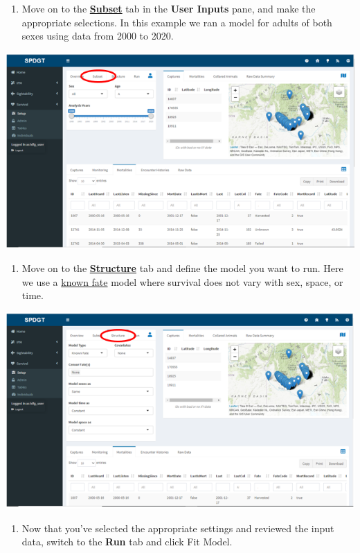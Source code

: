 \documentclass[
]{book}
\providecommand{\tightlist}{%
  \setlength{\itemsep}{0pt}\setlength{\parskip}{0pt}}
\begin{document}
\begin{enumerate}
\def\labelenumi{\arabic{enumi}.}
\setcounter{enumi}{5}
\tightlist
\item
  Move on to the \protect\hyperlink{surv-options}{\textbf{Subset}} tab in the \textbf{User Inputs} pane, and make the appropriate selections. In this example we ran a model for adults of both sexes using data from 2000 to 2020.
\end{enumerate}

\includegraphics{./www/surv_06.PNG}

\begin{enumerate}
\def\labelenumi{\arabic{enumi}.}
\setcounter{enumi}{6}
\tightlist
\item
  Move on to the \protect\hyperlink{surv-options}{\textbf{Structure}} tab and define the model you want to run. Here we use a \protect\hyperlink{gl-known-fate}{known fate} model where survival does not vary with sex, space, or time.
\end{enumerate}

\includegraphics{./www/surv_07.PNG}

\begin{enumerate}
\def\labelenumi{\arabic{enumi}.}
\setcounter{enumi}{7}
\tightlist
\item
  Now that you've selected the appropriate settings and reviewed the input data, switch to the \textbf{Run} tab and click {Fit Model}.
\end{enumerate}
\end{document}
